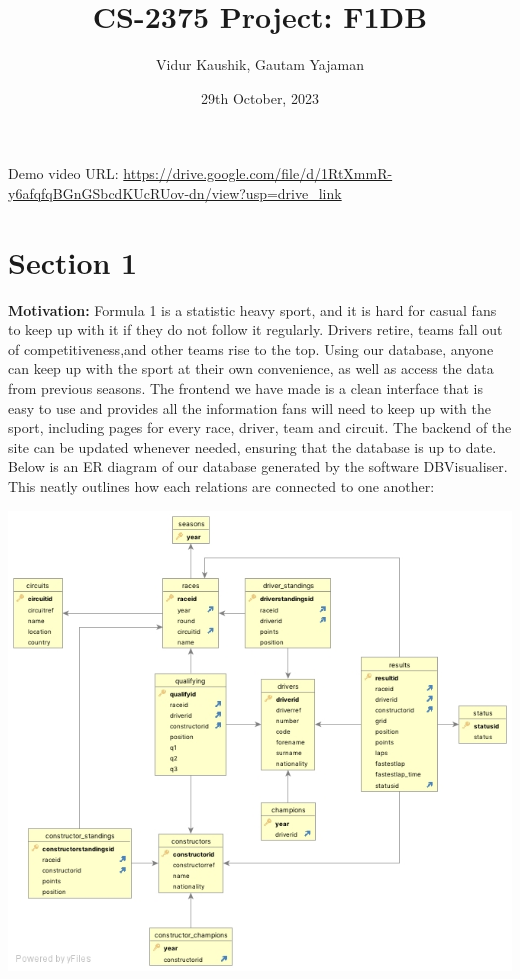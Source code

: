 \documentclass{article}
\title{CS-2375 Project: F1DB}
\author {Vidur Kaushik, Gautam Yajaman}
\date{29th October, 2023}
\begin{document}
\maketitle

\noindent
Demo video URL: \url{https://drive.google.com/file/d/1RtXmmR-y6afqfqBGnGSbcdKUcRUov-dn/view?usp=drive_link}

\section{Section 1}
\textbf{Motivation:} Formula 1 is a statistic heavy sport, and it is hard for casual fans to keep up with it if they do not follow it regularly. Drivers retire, teams fall out of competitiveness,and other teams rise to the top. Using our database, anyone can keep up with the sport at their own convenience, as well as access the data from previous seasons. The frontend we have made is a clean interface that is easy to use and provides all the information fans will need to keep up with the sport, including pages for every race, driver, team and circuit. The backend of the site can be updated whenever needed, ensuring that the database is up to date.\\

\noindent
Below is an ER diagram of our database generated by the software DBVisualiser. This neatly outlines how each relations are connected to one another:

\begin{center}
\includegraphics[scale=0.5]{ERDIAG.jpg}
\end{center}
\end{document}
